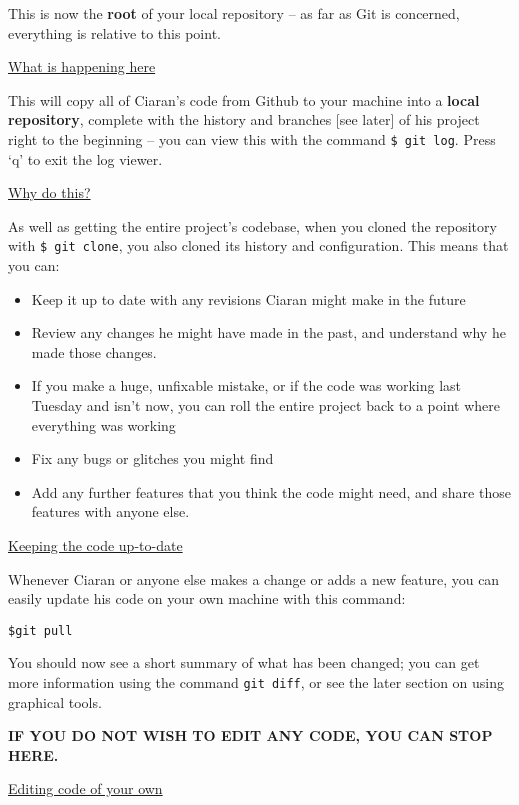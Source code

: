 \documentclass[11pt, a4paper, english]{article}
\begin{document}
This is now the \textbf{root} of your local repository – as far as Git is concerned, everything is relative to this point.


\underline{What is happening here}

This will copy all of Ciaran’s code from Github to your machine into a \textbf{local repository}, complete with the history and branches [see later] of his project right to the beginning – you can view this with the command \verb|$ git log|. Press ‘q’ to exit the log viewer.

\underline{Why do this?}

As well as getting the entire project’s codebase, when you cloned the repository with \verb|$ git clone|, you also cloned its history and configuration. This means that you can:

\begin{itemize}
\item Keep it up to date with any revisions Ciaran might make in the future
\item Review any changes he might have made in the past, and understand why he made those changes.
\item If you make a huge, unfixable mistake, or if the code was working last Tuesday and isn’t now, you can roll the entire project back to a point where everything was working
\item Fix any bugs or glitches you might find
\item Add any further features that you think the code might need, and share those features with anyone else.
\end{itemize}

\underline{Keeping the code up-to-date}

Whenever Ciaran or anyone else makes a change or adds a new feature, you can easily update his code on your own machine with this command:

\begin{verbatim}
$git pull
\end{verbatim}

You should now see a short summary of what has been changed; you can get more information using the command \verb|git diff|, or see the later section on using graphical tools.

\textbf{IF YOU DO NOT WISH TO EDIT ANY CODE, YOU CAN STOP HERE.}

\underline{Editing code of your own}
\end{document}
